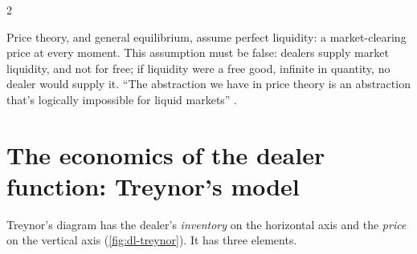 \begin{paracol}{2}
\begin{intuition}
Price theory, and general equilibrium, assume perfect liquidity: a market-clearing price at every moment. This assumption must be false: dealers supply market liquidity, and not
for free; if liquidity were a free good, infinite in quantity, no dealer would supply it. ``The abstraction we have in price theory is an abstraction that's logically impossible for
liquid markets'' .
\end{intuition}

\section{The economics of the dealer function: Treynor's model}\label{sec:dl-treynor}

Treynor's diagram has the dealer's \emph{inventory} on the horizontal axis and the \emph{price} on the vertical axis (\cref{fig:dl-treynor}). It has three elements.


\end{paracol}
